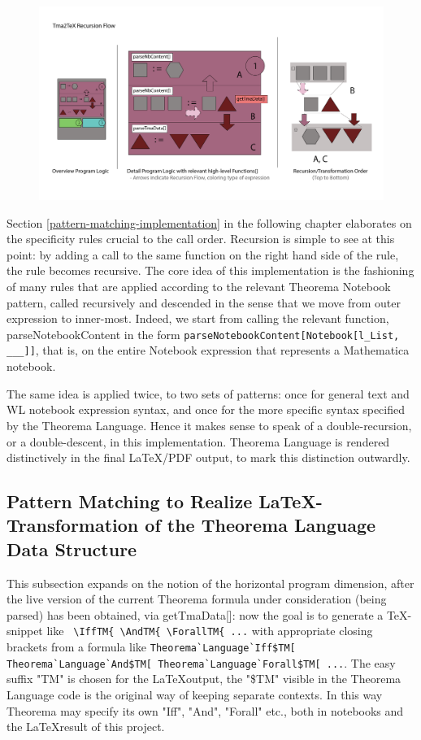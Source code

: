 \begin{figure}[h]
    \centering
    \includegraphics[scale=.35]{images/concept/Tma2Tex-Recursion-Flow-01.png}
    \caption{}
    \label{fig:high-level}
\end{figure}

Section \ref{pattern-matching-implementation} in the following chapter elaborates on the specificity rules crucial to the call order. Recursion is simple to see at this point: by adding a call to the same function on the right hand side of the rule, the rule becomes recursive. The core idea of this implementation is the fashioning of many rules that are applied according to the relevant Theorema Notebook pattern, called recursively and descended in the sense that we move from outer expression to inner-most. Indeed, we start from calling the relevant function, parseNotebookContent in the form \lstinline+parseNotebookContent[Notebook[l_List, ___]]+, that is, on the entire Notebook expression that represents a Mathematica notebook.

The same idea is applied twice, to two sets of patterns: once for general text and WL notebook expression syntax, and once for the more specific syntax specified by the Theorema Language. Hence it makes sense to speak of a double-recursion, or a double-descent, in this implementation. Theorema Language is rendered distinctively in the final \LaTeX/PDF output, to mark this distinction outwardly.

\subsection{Pattern Matching to Realize \LaTeX-Transformation of the Theorema Language Data Structure}

This subsection expands on the notion of the horizontal program dimension, after the live version of the current Theorema formula under consideration (being parsed) has been obtained, via getTmaData[]: now the goal is to generate a TeX-snippet like \verb| \IffTM{ \AndTM{ \ForallTM{ ...| with appropriate closing brackets from a formula like \verb|Theorema`Language`Iff$TM[ Theorema`Language`And$TM[ Theorema`Language`Forall$TM[ ...|. The easy suffix "TM" is chosen for the \LaTeX output, the "\$TM" visible in the Theorema Language code is the original way of keeping separate contexts. In this way Theorema may specify its own "Iff", "And", "Forall" etc., both in notebooks and the \LaTeX result of this project.

